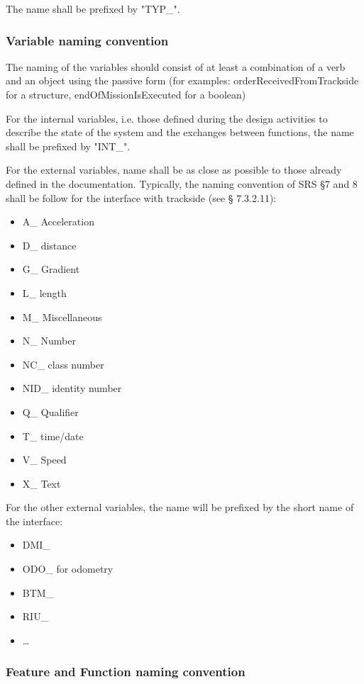 The name shall be prefixed by "TYP\_".

\subsubsection{Variable naming convention}

The naming of the variables should consist of at least a combination of a verb and an object using the passive form (for examples:   orderReceivedFromTrackside for a structure,     endOfMissionIsExecuted for a boolean)

For the internal variables, i.e. those defined during the design activities to describe the state of the system and the exchanges between functions, the name shall be prefixed by "INT\_".

For the external variables, name shall be as close as possible to those already defined in the documentation.
Typically, the naming convention of SRS §7 and 8 shall be follow for the interface with trackside (see § 7.3.2.11):

\begin{itemize}
\item A\_ Acceleration
\item D\_ distance
\item G\_ Gradient
\item L\_ length
\item M\_ Miscellaneous
\item N\_ Number
\item NC\_ class number
\item NID\_ identity number
\item Q\_ Qualifier
\item T\_ time/date
\item V\_ Speed
\item X\_ Text
\end{itemize}

For the other external  variables, the name will be prefixed by the short name of the interface:

\begin{itemize}
\item DMI\_
\item ODO\_ for odometry
\item BTM\_
\item RIU\_
\item \dots
\end{itemize}

\subsubsection{Feature and Function naming convention}

